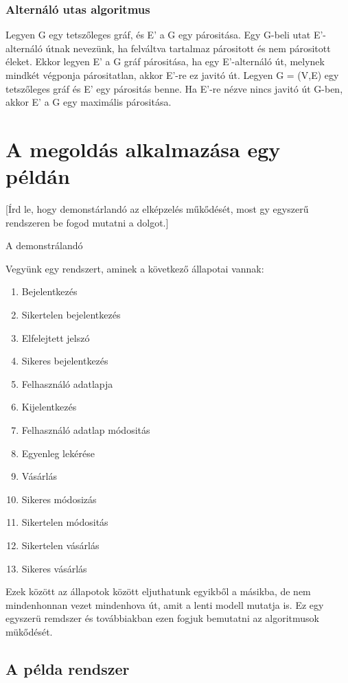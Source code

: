 \documentclass[12pt]{article}
\begin{document}
\subsubsection{Alternáló utas algoritmus}

Legyen G egy tetszőleges gráf, és E' a G egy párositása. Egy G-beli utat E'-alternáló útnak nevezünk, ha felváltva tartalmaz párositott és nem párositott éleket. Ekkor legyen E' a G gráf párositása, ha egy E'-alternáló út, melynek mindkét végponja párositatlan, akkor E'-re ez javitó út.
Legyen G = (V,E) egy tetszőleges gráf és E' egy párositás benne. Ha E'-re nézve nincs javitó út G-ben, akkor E' a G egy maximális párositása. ~\cite{algelm:kat}\\

\section{A megoldás alkalmazása egy példán}
[Írd le, hogy demonstárlandó az elképzelés műkődését, most gy egyszerű rendszeren be fogod mutatni a dolgot.]

A demonstrálandó 

Vegyünk egy rendszert, aminek a következő állapotai vannak:
\begin{enumerate}
\item Bejelentkezés
\item Sikertelen bejelentkezés
\item Elfelejtett jelszó
\item Sikeres bejelentkezés
\item Felhasználó adatlapja
\item Kijelentkezés
\item Felhasználó adatlap módositás
\item Egyenleg lekérése
\item Vásárlás
\item Sikeres módosizás
\item Sikertelen módositás
\item Sikertelen vásárlás
\item Sikeres vásárlás
\end{enumerate}

Ezek között az állapotok között eljuthatunk egyikből a másikba, de nem mindenhonnan vezet mindenhova út, amit a lenti modell mutatja is.
Ez egy egyszerü remdszer és továbbiakban ezen fogjuk bemutatni az algoritmusok mükődését.

\subsection{A példa rendszer}
\end{document}
